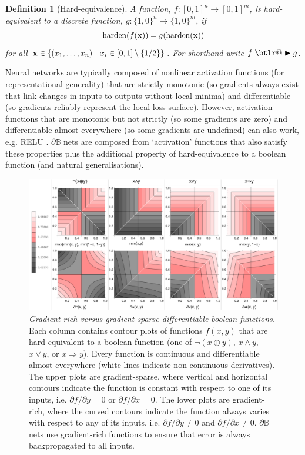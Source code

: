 \documentclass{article} %
\makeatletter
\newtheorem*{definition}{Definition}
\DeclareRobustCommand{\btright}{\mathrel{\mathpalette\btlr@\blacktriangleright}}
\newcommand{\btlr@}[2]{%
	\begingroup
	\sbox\z@{$\m@th#1\triangleright$}%
	\sbox\tw@{\resizebox{1.1\wd\z@}{1.1\ht\z@}{\raisebox{\depth}{$\m@th#1\mkern-1mu#2$}}}%
	\ht\tw@=\ht\z@ \dp\tw@=\dp\z@ \wd\tw@=\wd\z@
	\copy\tw@
	\endgroup
}
\makeatother
\begin{document}
\begin{definition}[Hard-equivalence]
	A function, $f: [0,1]^n \rightarrow [0,1]^m$, is {\em hard-equivalent} to a discrete function, $g: \{1,0\}^n \rightarrow \{1,0\}^m$,	if
	\begin{equation*}
	\operatorname{harden}(f({\bf x})) = g(\operatorname{harden}({\bf x}))
	\end{equation*}
	for all ${\bf x} \in \{(x_{1}, \dots, x_{n}) ~|~ x_{i} \in [0,1] \setminus \{1/2\}\}$. For shorthand write $f \btright g$.
\end{definition}

Neural networks are typically composed of nonlinear activation functions (for representational generality) that are strictly monotonic (so gradients always exist that link changes in inputs to outputs without local minima) and differentiable (so gradients reliably represent the local loss surface). However, activation functions that are monotonic but not strictly (so some gradients are zero) and differentiable almost everywhere (so some gradients are undefined) can also work, e.g. RELU \citep{10.5555/3104322.3104425}. $\partial \mathbb{B}$ nets are composed from `activation' functions that also satisfy these properties plus the additional property of hard-equivalence to a boolean function (and natural generalisations).

\begin{figure}[t!]
	\centering
	\includegraphics[trim=0pt 0pt 0pt 0pt, clip, width=1.0\textwidth]{logic-gates.png}
	\caption{{\em Gradient-rich versus gradient-sparse differentiable boolean functions.} Each column contains contour plots of functions $f(x,y)$ that are hard-equivalent to a boolean function (one of $\neg(x \oplus y)$, $x \wedge y$, $x \vee y$, or $x \Rightarrow y$). Every function is continuous and differentiable almost everywhere (white lines indicate non-continuous derivatives). The upper plots are gradient-sparse, where vertical and horizontal contours indicate the function is constant with respect to one of its inputs, i.e. $\partial f/\partial y = 0$ or $\partial f/\partial x = 0$. The lower plots are gradient-rich, where the curved contours indicate the function always varies with respect to any of its inputs, i.e. $\partial f/\partial y \neq 0$ and $\partial f/\partial x \neq 0$. $\partial \mathbb{B}$ nets use gradient-rich functions to ensure that error is always backpropagated to all inputs.} 
	\label{fig:gradient-rich}
\end{figure}
\end{document}
